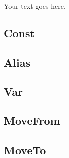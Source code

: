 \documentclass[11pt]{jsbook} %
\begin{document}
Your text goes here.

\subsection{Const}

\subsection{Alias}

\subsection{Var}

\subsection{MoveFrom}

\subsection{MoveTo}
\end{document}

